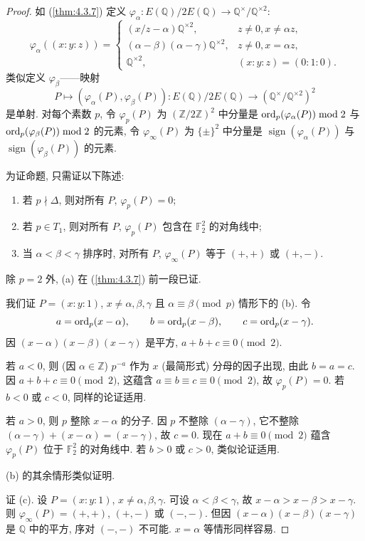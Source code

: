 \begin{proof}
如 (\ref{thm:4.3.7}) 定义 $\varphi_\alpha\colon E(\mathbb{Q})/2E(\mathbb{Q})\to\mathbb{Q}^{\times}/\mathbb{Q}^{\times2}$:
\[
\varphi_\alpha((x:y:z)) = \begin{cases}
(x/z - \alpha)\mathbb{Q}^{\times2}, & z\neq 0, x\neq\alpha z,\\
(\alpha-\beta)(\alpha-\gamma)\mathbb{Q}^{\times2}, & z\neq 0, x = \alpha z,\\
\mathbb{Q}^{\times2}, & (x:y:z) = (0:1:0).
\end{cases}
\]
类似定义 $\varphi_\beta$——映射
\[
P\mapsto(\varphi_\alpha(P), \varphi_\beta(P))\colon E(\mathbb{Q})/2E(\mathbb{Q})\to(\mathbb{Q}^{\times}/\mathbb{Q}^{\times2})^2
\]
是单射. 对每个素数 $p$, 令 $\varphi_p(P)$ 为 $(\mathbb{Z}/2\mathbb{Z})^2$ 中分量是 $\operatorname*{ord}\nolimits_p(\varphi_\alpha(P))\bmod 2$ 与 $\operatorname*{ord}\nolimits_p(\varphi_\beta(P))\bmod 2$ 的元素, 令 $\varphi_\infty(P)$ 为 $\{\pm\}^2$ 中分量是 $\operatorname{sign}(\varphi_\alpha(P))$ 与 $\operatorname{sign}(\varphi_\beta(P))$ 的元素.

为证命题, 只需证以下陈述:
\begin{enumerate}[label=\textup{(\alph*)}]
\item 若 $p\nmid\Delta$, 则对所有 $P$, $\varphi_p(P) = 0$;
\item 若 $p\in T_1$, 则对所有 $P$, $\varphi_p(P)$ 包含在 $\mathbb{F}_2^2$ 的对角线中;
\item 当 $\alpha < \beta < \gamma$ 排序时, 对所有 $P$, $\varphi_\infty(P)$ 等于 $(+,+)$ 或 $(+,-)$.
\end{enumerate}
除 $p = 2$ 外, (a) 在 (\ref{thm:4.3.7}) 前一段已证.

我们证 $P = (x:y:1)$, $x\neq\alpha,\beta,\gamma$ 且 $\alpha\equiv\beta\pmod{p}$ 情形下的 (b). 令
\[
a = \operatorname*{ord}\nolimits_p(x-\alpha), \qquad b = \operatorname*{ord}\nolimits_p(x-\beta), \qquad c = \operatorname*{ord}\nolimits_p(x-\gamma).
\]
因 $(x-\alpha)(x-\beta)(x-\gamma)$ 是平方, $a + b + c\equiv 0\pmod{2}$.

若 $a < 0$, 则 (因 $\alpha\in\mathbb{Z}$) $p^{-a}$ 作为 $x$ (最简形式) 分母的因子出现, 由此 $b = a = c$. 因 $a+b+c\equiv 0\pmod{2}$, 这蕴含 $a\equiv b\equiv c\equiv 0\pmod{2}$, 故 $\varphi_p(P) = 0$. 若 $b < 0$ 或 $c < 0$, 同样的论证适用.

若 $a > 0$, 则 $p$ 整除 $x-\alpha$ 的分子. 因 $p$ 不整除 $(\alpha-\gamma)$, 它不整除 $(\alpha-\gamma) + (x-\alpha) = (x-\gamma)$, 故 $c = 0$. 现在 $a + b\equiv 0\pmod{2}$ 蕴含 $\varphi_p(P)$ 位于 $\mathbb{F}_2^2$ 的对角线中. 若 $b > 0$ 或 $c > 0$, 类似论证适用.

(b) 的其余情形类似证明.

证 (c). 设 $P = (x:y:1)$, $x\neq\alpha,\beta,\gamma$. 可设 $\alpha < \beta < \gamma$, 故 $x-\alpha > x-\beta > x-\gamma$. 则 $\varphi_\infty(P) = (+,+)$, $(+,-)$ 或 $(-,-)$. 但因 $(x-\alpha)(x-\beta)(x-\gamma)$ 是 $\mathbb{Q}$ 中的平方, 序对 $(-,-)$ 不可能. $x = \alpha$ 等情形同样容易.
\end{proof}

